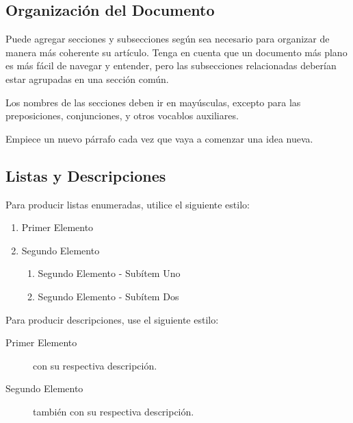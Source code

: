 \documentclass[a4paper,10pt,twocolumn]{article}
\begin{document}
	\subsection{Organización del Documento}\label{sub:results}
		Puede agregar secciones y subsecciones según sea necesario para organizar
		de manera más coherente su artículo. Tenga en cuenta que un documento más
		plano es más fácil de navegar y entender, pero las subsecciones relacionadas
		deberían estar agrupadas en una sección común.

		Los nombres de las secciones deben ir en mayúsculas, excepto para las
		preposiciones, conjunciones, y otros vocablos auxiliares.

		Empiece un nuevo párrafo cada vez que vaya a comenzar una idea nueva.

	\subsection{Listas y Descripciones}\label{sub:lists}
		Para producir listas enumeradas, utilice el siguiente estilo:
		\begin{enumerate}
			\item Primer Elemento
			\item Segundo Elemento
			\begin {enumerate}
				\item {Segundo Elemento - Subítem Uno}
				\item {Segundo Elemento - Subítem Dos}
			\end {enumerate}
		\end{enumerate}

		Para producir descripciones, use el siguiente estilo:

		\begin{description}
			\item [Primer Elemento] con su respectiva descripción.
			\item [Segundo Elemento] también con su respectiva descripción.
		\end{description}

\end{document}
